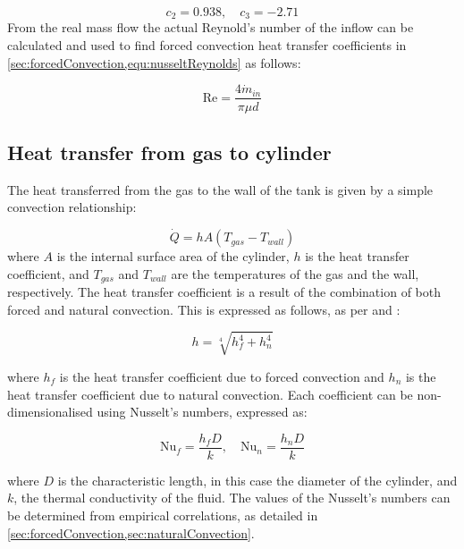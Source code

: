 \begin{equation}
c_2 =  0.938 ,  \quad c_3 = -2.71
\end{equation}
From the real mass flow the actual Reynold's number of the inflow can be calculated and used to find forced convection heat transfer coefficients in \cref{sec:forcedConvection,equ:nusseltReynolds} as follows: 

\begin{equation}
\text{Re} = \frac{4\dot m_{in}}{\pi \mu d}
\end{equation}




\subsection{Heat transfer from gas to cylinder}

The heat transferred from the gas to the wall of the tank is given by a simple convection relationship:

\begin{equation}
\label{equ:convection}
\dot Q = h A \left( T_{gas} - T_{wall}\right)
\end{equation}
where $A$ is the internal surface area of the cylinder, $h$ is the heat transfer coefficient, and $T_{gas}$ and $T_{wall}$ are the temperatures of the gas and the wall, respectively. The heat transfer coefficient is a result of the combination of both forced and natural convection. This is expressed as follows, as per \cite{Incropera2007} and \cite{Kakac1987}:

\begin{equation}
h = \sqrt[4]{h_f^4 + h_n^4} 
\end{equation}

\noindent where $h_f$ is the heat transfer coefficient due to forced convection and $h_n$ is the heat transfer coefficient due to natural convection. Each coefficient can be non-dimensionalised using Nusselt's numbers, expressed as:

\begin{equation}
\text{Nu}_f = \frac{h_f D}{k}, \quad \text{Nu}_n = \frac{h_n D}{k}
\end{equation}

\noindent where $D$ is the characteristic length, in this case the diameter of the cylinder, and $k$, the thermal conductivity of the fluid. The values of the Nusselt's numbers can be determined from empirical correlations, as detailed in \cref{sec:forcedConvection,sec:naturalConvection}.

